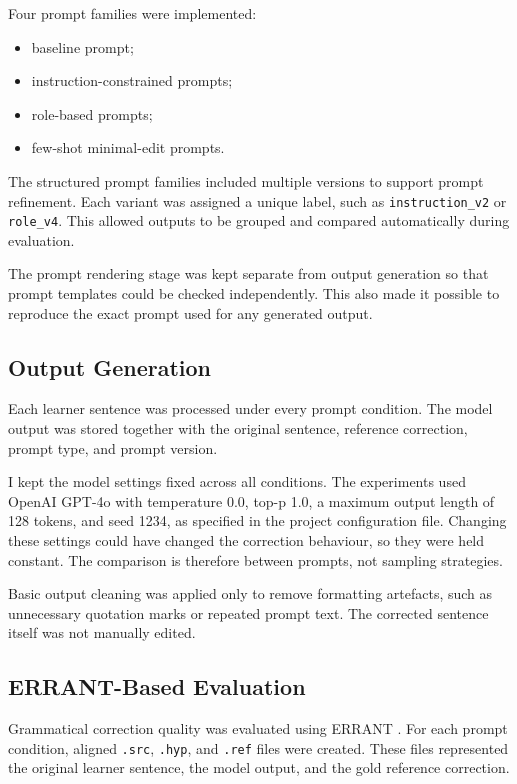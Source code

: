 Four prompt families were implemented:

\begin{itemize}
    \item baseline prompt;
    \item instruction-constrained prompts;
    \item role-based prompts;
    \item few-shot minimal-edit prompts.
\end{itemize}

The structured prompt families included multiple versions to support prompt refinement. Each variant was assigned a unique label, such as \texttt{instruction\_v2} or \texttt{role\_v4}. This allowed outputs to be grouped and compared automatically during evaluation.

The prompt rendering stage was kept separate from output generation so that prompt templates could be checked independently. This also made it possible to reproduce the exact prompt used for any generated output.

\subsection{Output Generation}

Each learner sentence was processed under every prompt condition. The model output was stored together with the original sentence, reference correction, prompt type, and prompt version.

I kept the model settings fixed across all conditions. The experiments used OpenAI GPT-4o with temperature 0.0, top-p 1.0, a maximum output length of 128 tokens, and seed 1234, as specified in the project configuration file. Changing these settings could have changed the correction behaviour, so they were held constant. The comparison is therefore between prompts, not sampling strategies.

Basic output cleaning was applied only to remove formatting artefacts, such as unnecessary quotation marks or repeated prompt text. The corrected sentence itself was not manually edited.

\subsection{ERRANT-Based Evaluation}

Grammatical correction quality was evaluated using ERRANT \cite{bryant-etal-2017-automatic}. For each prompt condition, aligned \texttt{.src}, \texttt{.hyp}, and \texttt{.ref} files were created. These files represented the original learner sentence, the model output, and the gold reference correction.

